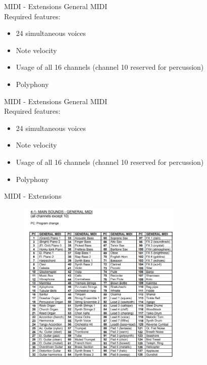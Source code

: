 \documentclass{beamer}
\begin{document}
\begin{frame}{MIDI - Extensions}
    General MIDI\\
    \vspace{5mm}
    Required features:
    \begin{itemize}
        \item 24 simultaneous voices
        \item Note velocity
        \item Usage of all 16 channels (channel 10 reserved for percussion)
        \item Polyphony
    \end{itemize}
\end{frame}

\begin{frame}{MIDI - Extensions}
    General MIDI\\
    \vspace{5mm}
    Required features:
    \begin{itemize}
        \item 24 simultaneous voices
        \item Note velocity
        \item Usage of all 16 channels (channel 10 reserved for percussion)
        \item Polyphony
    \end{itemize}
\end{frame}

\begin{frame}{MIDI - Extensions}
    \begin{figure}[h]
        \includegraphics[width=0.7\textwidth]{generalmidi.png}
    \end{figure}
\end{frame}
\end{document}
